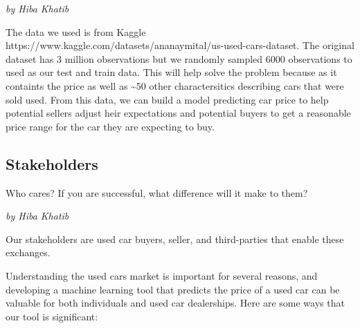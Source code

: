\documentclass[
  letterpaper,
  DIV=11,
  numbers=noendperiod]{scrartcl}
\begin{document}
\emph{by Hiba Khatib}

The data we used is from Kaggle
https://www.kaggle.com/datasets/ananaymital/us-used-cars-dataset. The
original dataset has 3 million observations but we randomly sampled 6000
observations to used as our test and train data. This will help solve
the problem because as it containts the price as well as
\textasciitilde50 other charactersitics describing cars that were sold
used. From this data, we can build a model predicting car price to help
potential sellers adjust heir expectations and potential buyers to get a
reasonable price range for the car they are expecting to buy.

\hypertarget{stakeholders}{%
\subsection{Stakeholders}\label{stakeholders}}

Who cares? If you are successful, what difference will it make to them?

\emph{by Hiba Khatib}

Our stakeholders are used car buyers, seller, and third-parties that
enable these exchanges.

Understanding the used cars market is important for several reasons, and
developing a machine learning tool that predicts the price of a used car
can be valuable for both individuals and used car dealerships. Here are
some ways that our tool is significant:
\end{document}
